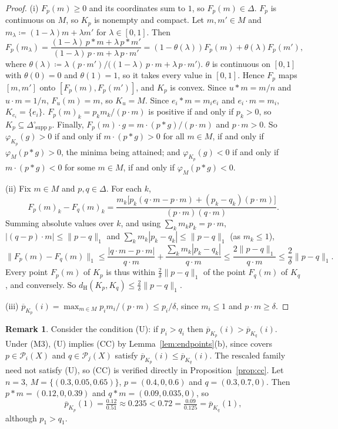 \documentclass[11pt]{article}
\theoremstyle{definition}
\newtheorem{remark}[theorem]{Remark}
\newcommand{\supp}{\operatorname{supp}}
\newcommand{\dH}{d_{\mathrm H}}
\newcommand{\Pc}{\mathcal P}
\newcommand{\up}{\overline{p}}
\begin{document}
\begin{proof}
(i) $F_p(m)\ge0$ and its coordinates sum to $1$, so $F_p(m)\in\Delta$. $F_p$ is continuous on $M$, so $K_p$ is nonempty and compact. Let $m,m'\in M$ and $m_\lambda\coloneqq(1-\lambda)m+\lambda m'$ for $\lambda\in[0,1]$. Then
\[
F_p(m_\lambda)=\frac{(1-\lambda)\,p*m+\lambda\,p*m'}{(1-\lambda)\,p\cdot m+\lambda\,p\cdot m'}=(1-\theta(\lambda))F_p(m)+\theta(\lambda)F_p(m'),
\]
where $\theta(\lambda)\coloneqq\lambda\,(p\cdot m')/\big((1-\lambda)\,p\cdot m+\lambda\,p\cdot m'\big)$.
$\theta$ is continuous on $[0,1]$ with $\theta(0)=0$ and $\theta(1)=1$, so it takes every value in $[0,1]$. Hence $F_p$ maps $[m,m']$ onto $[F_p(m),F_p(m')]$, and $K_p$ is convex. Since $u*m=m/n$ and $u\cdot m=1/n$, $F_u(m)=m$, so $K_u=M$. Since $e_i*m=m_ie_i$ and $e_i\cdot m=m_i$, $K_{e_i}=\{e_i\}$. $F_p(m)_k=p_km_k/(p\cdot m)$ is positive if and only if $p_k>0$, so $K_p\subseteq\Delta^\circ_{\supp p}$. Finally, $F_p(m)\cdot g=m\cdot(p*g)/(p\cdot m)$ and $p\cdot m>0$. So $\varphi_{K_p}(g)>0$ if and only if $m\cdot(p*g)>0$ for all $m\in M$, if and only if $\varphi_M(p*g)>0$, the minima being attained; and $\varphi_{K_p}(g)<0$ if and only if $m\cdot(p*g)<0$ for some $m\in M$, if and only if $\varphi_M(p*g)<0$.

(ii) Fix $m\in M$ and $p,q\in\Delta$. For each $k$,
\[
F_p(m)_k-F_q(m)_k=\frac{m_k\big[p_k(q\cdot m-p\cdot m)+(p_k-q_k)(p\cdot m)\big]}{(p\cdot m)(q\cdot m)}.
\]
Summing absolute values over $k$, and using $\sum_km_kp_k=p\cdot m$, $|(q-p)\cdot m|\le\|p-q\|_1$ and $\sum_km_k|p_k-q_k|\le\|p-q\|_1$ (as $m_k\le1$),
\[
\|F_p(m)-F_q(m)\|_1\le\frac{|q\cdot m-p\cdot m|}{q\cdot m}+\frac{\sum_km_k|p_k-q_k|}{q\cdot m}\le\frac{2\|p-q\|_1}{q\cdot m}\le\frac{2}{\delta}\|p-q\|_1.
\]
Every point $F_p(m)$ of $K_p$ is thus within $\frac2\delta\|p-q\|_1$ of the point $F_q(m)$ of $K_q$, and conversely. So $\dH(K_p,K_q)\le\frac2\delta\|p-q\|_1$.

(iii) $\up_{K_p}(i)=\max_{m\in M}p_im_i/(p\cdot m)\le p_i/\delta$, since $m_i\le1$ and $p\cdot m\ge\delta$.
\end{proof}

\begin{remark}\label{rem:U}
Consider the condition (U): if $p_i>q_i$ then $\up_{K_p}(i)>\up_{K_q}(i)$. Under (M3), (U) implies (CC) by Lemma~\ref{lem:endpoints}(b), since covers $p\in\Pc_i(X)$ and $q\in\Pc_j(X)$ satisfy $\up_{K_p}(i)\le\up_{K_q}(i)$. The rescaled family need not satisfy (U), so (CC) is verified directly in Proposition~\ref{prop:cc}. Let $n=3$, $M=\{(0.3,0.05,0.65)\}$, $p=(0.4,0,0.6)$ and $q=(0.3,0.7,0)$. Then $p*m=(0.12,0,0.39)$ and $q*m=(0.09,0.035,0)$, so
\[
\up_{K_p}(1)=\tfrac{0.12}{0.51}\approx0.235<0.72=\tfrac{0.09}{0.125}=\up_{K_q}(1),
\]
although $p_1>q_1$.
\end{remark}
\end{document}
